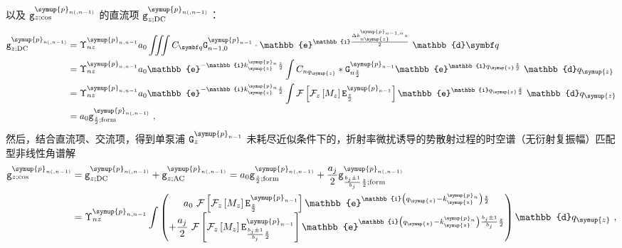 以及 ${\mathtt{g}}^{\symup{p}_{n(,n-1)}}_{z;\cos}$ 的直流项 ${\mathtt{g}}^{\symup{p}_{n(,n-1)}}_{z;\text{DC}}$：
\begin{subequations} \label{eq:2-268}
	\abovedisplayskip=13pt
	\belowdisplayskip=13pt
	\begin{align}
		{\mathtt{g}}^{\symup{p}_{n(,n-1)}}_{z;\text{DC}} &= \Upsilon^{\symup{p}_{n,n-1}}_{nz} a_0 \iiint C_{\symbf q} {\mathtt{G}}^{\symup{p}_{n-1}}_{n-1,0} \cdot \mathbb{e}^{\mathbb{i} \frac{ \Delta k^{\symup{p}_{n-1,n}}_{n\symup{z}} z }{ 2 }} ~ \mathbb{d}{\symbf q} \label{eq:2-268a} \\ &= \Upsilon^{\symup{p}_{n,n-1}}_{nz} a_0 \mathbb{e}^{ - \mathbb{i} k^{\symup{p}_{n}}_{\symup{z}} \frac{ z }{ 2 }} \int C_{nq_{\symup{z}}} * {\mathtt{G}}^{\symup{p}_{n-1}}_{n \frac{ z }{ 2 }} \mathbb{e}^{\mathbb{i} q_{\symup{z}}  \frac{ z }{ 2 }} ~ \mathbb{d}{q_{\symup{z}}} \label{eq:2-268b} \\ &= \Upsilon^{\symup{p}_{n,n-1}}_{nz} a_0 \mathbb{e}^{ - \mathbb{i} k^{\symup{p}_{n}}_{\symup{z}} \frac{ z }{ 2 }} \int \mathcal F \left[ \mathcal F_{z} \left[ M_{z} \right] {\mathtt{E}}^{\symup{p}_{n-1}}_{ \frac{ z }{ 2 }} \right] \mathbb{e}^{\mathbb{i} q_{\symup{z}} \frac{ z }{ 2 }} ~ \mathbb{d}{q_{\symup{z}}} \label{eq:2-268c} \\ &= a_0 {\mathtt{g}}^{\symup{p}_{n(,n-1)}}_{\frac{ z }{ 2 };\text{form}} \label{eq:2-268d}~,
	\end{align}
\end{subequations}
然后，结合直流项、交流项，得到单泵浦 ${\mathtt{G}}^{\symup{p}_{n-1}}_{z}$ 未耗尽近似条件下的，折射率微扰诱导的势散射过程的时空谱（无衍射复振幅）匹配型非线性角谱解
\begin{subequations} \label{eq:2-269}
	\abovedisplayskip=13pt
	\belowdisplayskip=13pt
	\begin{align}
		{\mathtt{g}}^{\symup{p}_{n(,n-1)}}_{z;\cos} &= {\mathtt{g}}^{\symup{p}_{n(,n-1)}}_{z;\text{DC}} + {\mathtt{g}}^{\symup{p}_{n(,n-1)}}_{z;\text{AC}} = a_0 {\mathtt{g}}^{\symup{p}_{n(,n-1)}}_{\frac{ z }{ 2 };\text{form}} + \frac{ a_j }{ 2 } {\mathtt{g}}^{\symup{p}_{n(,n-1)}}_{\frac{b_j \pm 1}{b_j} \frac{ z }{ 2 };\text{form}} \label{eq:2-269a} \\ &= \Upsilon^{\symup{p}_{n,n-1}}_{nz} \int \begin{pmatrix} a_0 ~ \mathcal F \left[ \mathcal F_{z} \left[ M_{z} \right] {\mathtt{E}}^{\symup{p}_{n-1}}_{ \frac{ z }{ 2 }} \right] \mathbb{e}^{ \mathbb{i} \left( q_{\symup{z}} - k^{\symup{p}_{n}}_{\symup{z}} \right) \frac{ z }{ 2 }} \\ + \displaystyle{\frac{ a_j }{ 2 }} ~ \mathcal F \left[ \mathcal F_{z} \left[ M_{z} \right] {\mathtt{E}}^{\symup{p}_{n-1}}_{\frac{b_j \pm 1}{b_j} \frac{ z }{ 2 }} \right] \mathbb{e}^{ \mathbb{i} \left( q_{\symup{z}} - k^{\symup{p}_{n}}_{\symup{z}} \right) \frac{b_j \pm 1}{b_j} \frac{ z }{ 2 }} \end{pmatrix} \mathbb{d}{q_{\symup{z}}} \label{eq:2-269b}~,
	\end{align}
\end{subequations}
